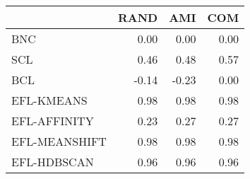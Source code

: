 \begin{tabular}{lrrr}
\toprule
 & RAND & AMI & COM \\
\midrule
BNC & 0.00 & 0.00 & 0.00 \\
SCL & 0.46 & 0.48 & 0.57 \\
BCL & -0.14 & -0.23 & 0.00 \\
EFL-KMEANS & 0.98 & 0.98 & 0.98 \\
EFL-AFFINITY & 0.23 & 0.27 & 0.27 \\
EFL-MEANSHIFT & 0.98 & 0.98 & 0.98 \\
EFL-HDBSCAN & 0.96 & 0.96 & 0.96 \\
\bottomrule
\end{tabular}
